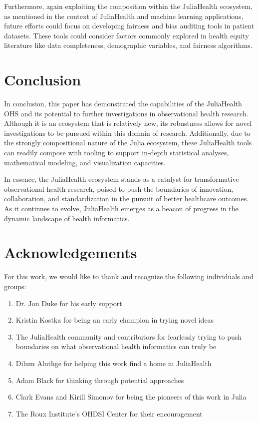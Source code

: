 \documentclass{juliacon}
\begin{document}
Furthermore, again exploiting the composition within the JuliaHealth ecosystem, as mentioned in the context of JuliaHealth and machine learning applications, future efforts could focus on developing fairness and bias auditing tools in patient datasets.
These tools could consider factors commonly explored in health equity literature like data completeness, demographic variables, and fairness algorithms. 

\section{Conclusion}

In conclusion, this paper has demonstrated the capabilities of the JuliaHealth OHS and its potential to further investigations in observational health research.
Although it is an ecosystem that is relatively new, its robustness allows for novel investigations to be pursued within this domain of research. 
Additionally, due to the strongly compositional nature of the Julia ecosystem, these JuliaHealth tools can readily compose with tooling to support in-depth statistical analyses, mathematical modeling, and visualization capacities.

In essence, the JuliaHealth ecosystem stands as a catalyst for transformative observational health research, poised to push the boundaries of innovation, collaboration, and standardization in the pursuit of better healthcare outcomes. As it continues to evolve, JuliaHealth emerges as a beacon of progress in the dynamic landscape of health informatics.

\section{Acknowledgements}

For this work, we would like to thank and recognize the following individuals and groups: 

\begin{enumerate}

  \item Dr. Jon Duke for his early support
  \item Kristin Kostka for being an early champion in trying novel ideas
  \item The JuliaHealth community and contributors for fearlessly trying to push boundaries on what observational health informatics can truly be
  \item Dilum Aluthge for helping this work find a home in JuliaHealth
  \item Adam Black for thinking through potential approaches
  \item Clark Evans and Kirill Simonov for being the pioneers of this work in Julia
  \item The Roux Institute's OHDSI Center for their encouragement

\end{enumerate}


\end{document}
